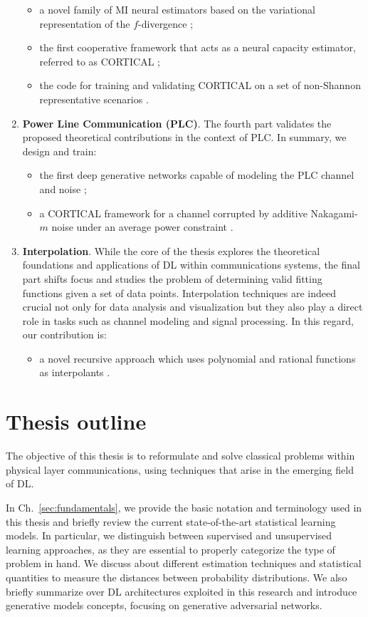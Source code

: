 \begin{enumerate}
\begin{itemize}
    \item a novel family of MI neural estimators based on the variational representation of the $f$-divergence \cite{f-DIME};
    \item the first cooperative framework that acts as a neural capacity estimator, referred to as CORTICAL \cite{CORTICAL};
    \item the code for training and validating CORTICAL on a set of non-Shannon representative scenarios \cite{CORTICAL_github}.
\end{itemize}
\item \textbf{Power Line Communication (PLC)}. The fourth part validates the proposed theoretical contributions in the context of PLC. In summary, we design and train:
\begin{itemize}
    \item the first deep generative networks capable of modeling the PLC channel and noise \cite{RighiniLetizia2019, Letizia2019a};
    \item a CORTICAL framework for a channel corrupted by additive Nakagami-$m$ noise under an average power constraint \cite{LetiziaIsplc2021}.
\end{itemize}
\item \textbf{Interpolation}. 
While the core of the thesis explores the theoretical foundations and applications of DL within communications systems, the final part shifts focus and studies the problem of determining valid fitting functions given a set of data points. Interpolation techniques are indeed crucial not only for data analysis and visualization but they also play a direct role in tasks such as channel modeling and signal processing. In this regard, our contribution is:
\begin{itemize}
    \item a novel recursive approach which uses polynomial and rational functions as interpolants \cite{LetiziaRobotics, 9525383}.
    \end{itemize}
\end{enumerate}

\section{Thesis outline}
The objective of this thesis is to reformulate and solve classical problems within physical layer communications, using techniques that arise in the emerging field of DL. 

In Ch.~\ref{sec:fundamentals}, we provide the basic notation and terminology used in this thesis and briefly review the current state-of-the-art statistical learning models. In particular, we distinguish between supervised and unsupervised learning approaches, as they are essential to properly categorize the type of problem in hand. We discuss about different estimation techniques and statistical quantities to measure the distances between probability distributions. We also briefly summarize over DL architectures exploited in this research and introduce generative models concepts, focusing on generative adversarial networks. 

